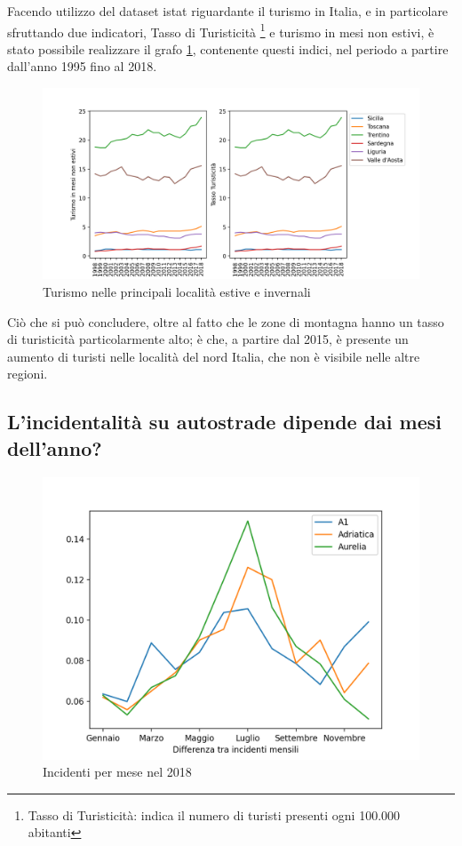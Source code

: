 \documentclass[a4paper]{report}
\begin{document}
Facendo utilizzo del dataset istat riguardante il turismo in Italia, e in particolare sfruttando 
due indicatori, Tasso di Turisticità
\footnote{Tasso di Turisticità: indica il numero di turisti presenti ogni 100.000 abitanti} 
e turismo in mesi non estivi,
è stato possibile realizzare il grafo \ref{fig:turismo}, contenente questi indici, 
nel periodo a partire dall'anno 1995 fino al 2018.

\begin{figure}
    \includegraphics[width=\linewidth]{../src/turismo/turismo.png}
    \caption{Turismo nelle principali località estive e invernali}
    \label{fig:turismo}
\end{figure}

Ciò che si può concludere, oltre al fatto che le zone di montagna hanno 
un tasso di turisticità particolarmente alto; 
è che, a partire dal 2015, è presente un aumento di turisti nelle località del 
nord Italia, che non è visibile nelle altre regioni.


\subsection{L'incidentalità su autostrade dipende dai mesi dell'anno?}
\begin{figure}
    \includegraphics[width=\linewidth]{../src/incidenti/incidenti_aci/autostrade/mesi_autostrade.png}
    \caption{Incidenti per mese nel 2018}
    \label{fig:incidenti-per-mese}
\end{figure}
\end{document}
